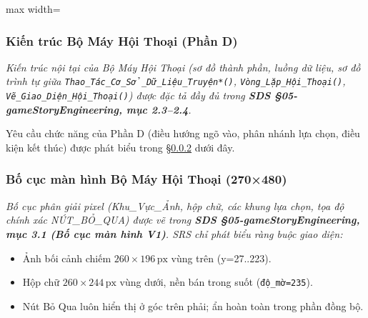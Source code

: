 \documentclass[12pt,a4paper]{article}
\begin{document}
\begin{center}
\begin{adjustbox}{max width=\linewidth}
\end{adjustbox}
\end{center}

\subsubsection{Kiến trúc Bộ Máy Hội Thoại (Phần D)}
\textit{Kiến trúc nội tại của Bộ Máy Hội Thoại (sơ đồ thành phần, luồng dữ liệu,
sơ đồ trình tự giữa \texttt{Thao\_Tác\_Cơ\_Sở\_Dữ\_Liệu\_Truyện*()}, \texttt{Vòng\_Lặp\_Hội\_Thoại()},
\texttt{Vẽ\_Giao\_Diện\_Hội\_Thoại()}) được đặc tả đầy đủ trong
\textbf{SDS §05-gameStoryEngineering, mục 2.3--2.4}.}

Yêu cầu chức năng của Phần D (điều hướng ngõ vào, phân nhánh lựa chọn, điều kiện
kết thúc) được phát biểu trong §\ref{subsec:v2-func} dưới đây.

\subsubsection{Bố cục màn hình Bộ Máy Hội Thoại (270×480)}\label{subsec:v2-func}
\textit{Bố cục phân giải pixel (Khu\_Vực\_Ảnh, hộp chữ, các khung lựa chọn, tọa độ
chính xác NÚT\_BỎ\_QUA) được vẽ trong \textbf{SDS §05-gameStoryEngineering, mục 3.1 (Bố cục màn hình V1)}.
SRS chỉ phát biểu ràng buộc giao diện:}
\begin{itemize}[nosep]
  \item Ảnh bối cảnh chiếm $260\times196\,\text{px}$ vùng trên (y=27..223).
  \item Hộp chữ $260\times244\,\text{px}$ vùng dưới, nền bán trong suốt (\texttt{độ\_mờ=235}).
  \item Nút Bỏ Qua luôn hiển thị ở góc trên phải; ẩn hoàn toàn trong phần đồng bộ.
\end{itemize}
\end{document}
